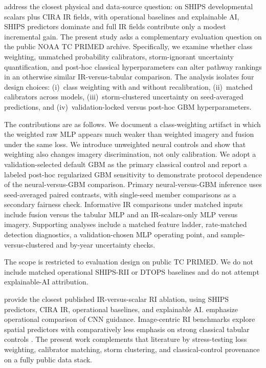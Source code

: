 \documentclass[11pt]{article}
\begin{document}
\citet{lagerquist2025} address the closest physical and data-source question: on SHIPS developmental scalars plus CIRA IR fields, with operational baselines and explainable AI, SHIPS predictors dominate and full IR fields contribute only a modest incremental gain. The present study asks a complementary evaluation question on the public NOAA {TC PRIMED} archive. Specifically, we examine whether class weighting, unmatched probability calibrators, storm-ignorant uncertainty quantification, and post-hoc classical hyperparameters can alter pathway rankings in an otherwise similar IR-versus-tabular comparison. The analysis isolates four design choices: (i)~class weighting with and without recalibration, (ii)~matched calibrators across models, (iii)~storm-clustered uncertainty on seed-averaged predictions, and (iv)~validation-locked versus post-hoc GBM hyperparameters.

The contributions are as follows. We document a class-weighting artifact in which the weighted raw MLP appears much weaker than weighted imagery and fusion under the same loss. We introduce unweighted neural controls and show that weighting also changes imagery discrimination, not only calibration. We adopt a validation-selected default GBM as the primary classical control and report a labeled post-hoc regularized GBM sensitivity to demonstrate protocol dependence of the neural-versus-GBM comparison. Primary neural-versus-GBM inference uses seed-averaged paired contrasts, with single-seed member comparisons as a secondary fairness check. Informative IR comparisons under matched inputs include fusion versus the tabular MLP and an IR-scalars-only MLP versus imagery. Supporting analyses include a matched feature ladder, rate-matched detection diagnostics, a validation-chosen MLP operating point, and sample-versus-clustered and by-year uncertainty checks.

The scope is restricted to evaluation design on public {TC PRIMED}. We do not include matched operational SHIPS-RII or DTOPS baselines \citep{demaria2021,onderlinde2018} and do not attempt explainable-AI attribution.

\citet{lagerquist2025} provide the closest published IR-versus-scalar RI ablation, using SHIPS predictors, CIRA IR, operational baselines, and explainable AI. \citet{griffin2022} emphasize operational comparison of CNN guidance. Image-centric RI benchmarks explore spatial predictors with comparatively less emphasis on strong classical tabular controls \citep{bai2020}. The present work complements that literature by stress-testing loss weighting, calibrator matching, storm clustering, and classical-control provenance on a fully public data stack.
\end{document}
